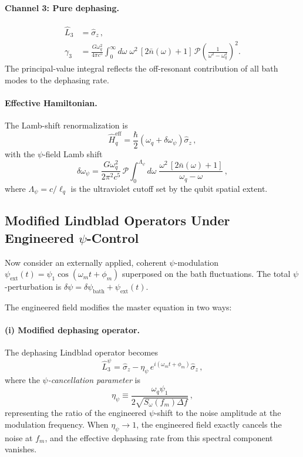 \documentclass[aps,prl,twocolumn,superscriptaddress,nofootinbib,longbibliography]{revtex4-2}
\begin{document}
\paragraph{Channel 3: Pure dephasing.}
\begin{align}
\hat{L}_3 &= \hat{\sigma}_z\,, \label{eq:L3}\\
\gamma_3 &= \frac{G\omega_q^2}{4\pi c^5}\int_0^\infty d\omega\;
\omega^2\,[2\bar{n}(\omega)+1]\,\mathcal{P}\!\left(\frac{1}{\omega^2
- \omega_q^2}\right)^{\!\!2}\!. \label{eq:gamma3}
\end{align}
The principal-value integral reflects the off-resonant contribution
of all bath modes to the dephasing rate.

\paragraph{Effective Hamiltonian.} The Lamb-shift renormalization is
\begin{equation}
\hat{H}_q^{\text{eff}} = \frac{\hbar}{2}(\omega_q + \delta\omega_\psi)
\hat{\sigma}_z\,,
\end{equation}
with the $\psi$-field Lamb shift
\begin{equation}\label{eq:lamb-shift}
\delta\omega_\psi = \frac{G\omega_q^2}{2\pi^2 c^5}\,
\mathcal{P}\!\int_0^{\Lambda_\psi}\!\! d\omega\;
\frac{\omega^2\,[2\bar{n}(\omega)+1]}{\omega_q - \omega}\,,
\end{equation}
where $\Lambda_\psi = c/\ell_q$ is the ultraviolet cutoff set by the
qubit spatial extent.

\subsection{Modified Lindblad Operators Under Engineered $\psi$-Control}

Now consider an externally applied, coherent $\psi$-modulation
$\psi_{\text{ext}}(t) = \psi_1\cos(\omega_m t + \phi_m)$ superposed on
the bath fluctuations. The total $\psi$-perturbation is
$\delta\psi = \delta\psi_{\text{bath}} + \psi_{\text{ext}}(t)$.

The engineered field modifies the master equation in two ways:

\paragraph{(i) Modified dephasing operator.}
The dephasing Lindblad operator becomes
\begin{equation}\label{eq:L3-mod}
\hat{L}_3^\psi = \hat{\sigma}_z - \eta_\psi\,
e^{i(\omega_m t + \phi_m)}\hat{\sigma}_z\,,
\end{equation}
where the \emph{$\psi$-cancellation parameter} is
\begin{equation}\label{eq:eta-def}
\eta_\psi \equiv \frac{\omega_q\psi_1}{2\sqrt{S_\omega(f_m)\Delta f}}\,,
\end{equation}
representing the ratio of the engineered $\psi$-shift to the noise
amplitude at the modulation frequency. When $\eta_\psi \to 1$, the
engineered field exactly cancels the noise at $f_m$, and the effective
dephasing rate from this spectral component vanishes.
\end{document}
